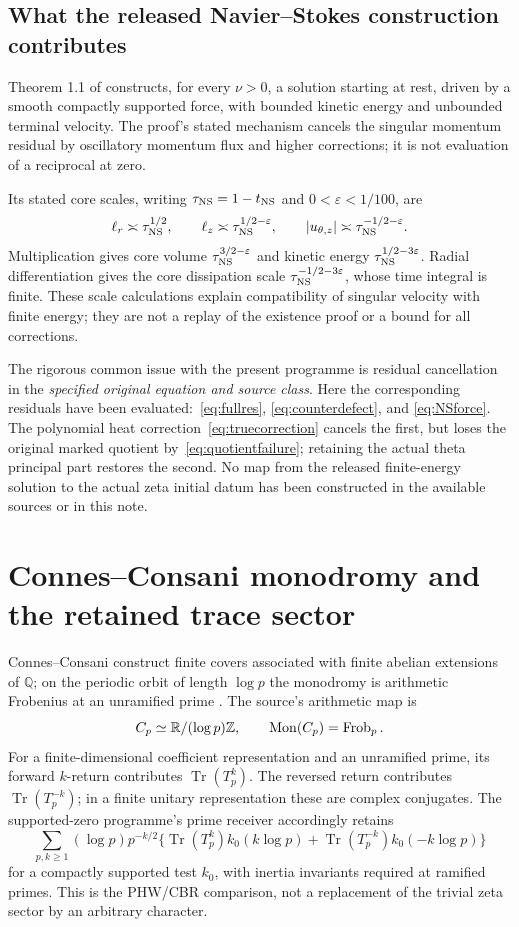 \documentclass[11pt,a4paper]{article}
\theoremstyle{definition}\newtheorem{definition}[theorem]{Definition}\newtheorem{remark}[theorem]{Remark}
\newcommand{\Tr}{\operatorname{Tr}}\newcommand{\im}{\operatorname{im}}\newcommand{\diag}{\operatorname{diag}}\newcommand{\rad}{\operatorname{rad}}\newcommand{\Spec}{\operatorname{Spec}}\newcommand{\Ann}{\operatorname{Ann}}\newcommand{\Disc}{\operatorname{Disc}}\newcommand{\Hom}{\operatorname{Hom}}\newcommand{\Res}{\operatorname{Res}}
\begin{document}
\subsection{What the released Navier--Stokes construction contributes}
Theorem 1.1 of \cite{NS} constructs, for every $\nu>0$, a solution starting at rest, driven by a smooth compactly supported force, with bounded kinetic energy and unbounded terminal velocity. The proof's stated mechanism cancels the singular momentum residual by oscillatory momentum flux and higher corrections; it is not evaluation of a reciprocal at zero.

Its stated core scales, writing $\tau_{\rm NS}=1-t_{\rm NS}$ and $0<\varepsilon<1/100$, are
\[
 \ell_r\asymp\tau_{\rm NS}^{1/2},\qquad
 \ell_z\asymp\tau_{\rm NS}^{1/2-\varepsilon},\qquad
 |u_{\theta,z}|\asymp\tau_{\rm NS}^{-1/2-\varepsilon}.
\]
Multiplication gives core volume $\tau_{\rm NS}^{3/2-\varepsilon}$ and kinetic energy $\tau_{\rm NS}^{1/2-3\varepsilon}$. Radial differentiation gives the core dissipation scale $\tau_{\rm NS}^{-1/2-3\varepsilon}$, whose time integral is finite. These scale calculations explain compatibility of singular velocity with finite energy; they are not a replay of the existence proof or a bound for all corrections.

The rigorous common issue with the present programme is residual cancellation in the \emph{specified original equation and source class}. Here the corresponding residuals have been evaluated:~\eqref{eq:fullres}, \eqref{eq:counterdefect}, and \eqref{eq:NSforce}. The polynomial heat correction~\eqref{eq:truecorrection} cancels the first, but loses the original marked quotient by~\eqref{eq:quotientfailure}; retaining the actual theta principal part restores the second. No map from the released finite-energy solution to the actual zeta initial datum has been constructed in the available sources or in this note.

\section{Connes--Consani monodromy and the retained trace sector}
Connes--Consani construct finite covers associated with finite abelian extensions of $\mathbb Q$; on the periodic orbit of length $\log p$ the monodromy is arithmetic Frobenius at an unramified prime \cite[Theorem 1 and the mapping-torus theorem]{CC}. The source's arithmetic map is
\[
 C_p\simeq\mathbb R/(\log p)\mathbb Z,\qquad \operatorname{Mon}(C_p)=\operatorname{Frob}_p.
\]
For a finite-dimensional coefficient representation and an unramified prime, its forward $k$-return contributes $\Tr(T_p^k)$. The reversed return contributes $\Tr(T_p^{-k})$; in a finite unitary representation these are complex conjugates. The supported-zero programme's prime receiver accordingly retains
\[
 \sum_{p,k\ge1}(\log p)p^{-k/2}
 \bigl\{\Tr(T_p^k)k_0(k\log p)+\Tr(T_p^{-k})k_0(-k\log p)\bigr\}
\]
for a compactly supported test $k_0$, with inertia invariants required at ramified primes. This is the PHW/CBR comparison, not a replacement of the trivial zeta sector by an arbitrary character.
\end{document}
